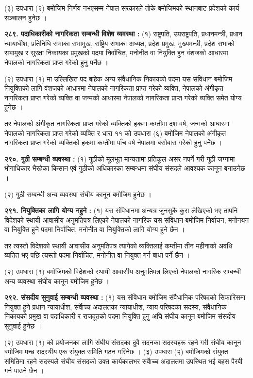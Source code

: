 (३) उपधारा (२) बमोजिम निर्णय नभएसम्म नेपाल सरकारले तोके बमोजिमको स्थानबाट प्रदेशको कार्य सञ्चालन हुनेछ ।

\textbf{२८९. पदाधिकारीको नागरिकता सम्बन्धी विशेष व्यवस्था :} (१) राष्ट्रपति, उपराष्ट्रपति, प्रधानमन्त्री, प्रधान न्यायाधीश, प्रतिनिधि सभाका सभामुख, राष्ट्रिय सभाका अध्यक्ष, प्रदेश प्रमुख, मुख्यमन्त्री, प्रदेश सभाको सभामुख र सुरक्षा निकायका प्रमुखको पदमा निर्वाचित, मनोनीत वा नियुक्ति हुन वंशजको आधारमा नेपालको नागरिकता प्राप्त गरेको हुनु पर्नेछ ।

(२) उपधारा (१) मा उल्लिखित पद बाहेक अन्य संवैधानिक निकायको पदमा यस संविधान बमोजिम नियुक्तिको लागि वंशजको आधारमा नेपालको नागरिकता प्राप्त गरेको व्यक्ति, नेपालको अंगीकृत नागरिकता प्राप्त गरेको व्यक्ति वा जन्मको आधारमा नेपालको नागरिकता प्राप्त गरेको व्यक्ति समेत योग्य हुनेछ ।

तर नेपालको अंगीकृत नागरिकता प्राप्त गरेको व्यक्तिको हकमा कम्तीमा दश वर्ष, जन्मको आधारमा नेपालको नागरिकता प्राप्त गरेको व्यक्ति र धारा ११ को उपधारा (६) बमोजिम नेपालको अंगीकृत नागरिकता प्राप्त गरेको व्यक्तिको हकमा कम्तीमा पाँच वर्ष नेपालमा बसोबास गरेको हुनु पर्नेछ ।

\textbf{२९०. गुठी सम्बन्धी व्यवस्था :} (१) गुठीको मूलभूत मान्यतामा प्रतिकूल असर नपर्ने गरी गुठी जग्गामा भोगाधिकार भैरहेका किसान एवं गुठीको अधिकारका सम्बन्धमा संघीय संसदले आवश्यक कानून बनाउनेछ ।

(२) गुठी सम्बन्धी अन्य व्यवस्था संघीय कानून बमोजिम हुनेछ ।

\textbf{२९१. नियुक्तिका लागि योग्य नहुने :} (१) यस संविधानमा अन्यत्र जुनसुकै कुरा लेखिएको भए तापनि विदेशको स्थायी आवासीय अनुमतिपत्र लिएको नेपालको नागरिक यस संविधान बमोजिम निर्वाचन, मनोनयन वा नियुक्ति हुने पदमा निर्वाचित, मनोनीत वा नियुक्तिको लागि योग्य हुने छैन ।

तर त्यस्तो विदेशको स्थायी आवासीय अनुमतिपत्र त्यागेको व्यक्तिलाई कम्तीमा तीन महीनाको अवधि व्यतित भए पछि त्यस्तो पदमा निर्वाचित, मनोनीत वा नियुक्त गर्न बाधा पर्ने छैन ।

(२) उपधारा (१) बमोजिमको विदेशको स्थायी आवासीय अनुमतिपत्र लिएको नेपालको नागरिक सम्बन्धी अन्य व्यवस्था संघीय कानून बमोजिम हुनेछ ।

\textbf{२९२. संसदीय सुनुवाई सम्बन्धी व्यवस्था :} (१) यस संविधान बमोजिम संवैधानिक परिषदको सिफारिसमा नियुक्त हुने प्रधान न्यायाधीश, सर्वाेच्च अदालतका न्यायाधीश, न्याय परिषदका सदस्य, संवैधानिक निकायको प्रमुख वा पदाधिकारी र राजदूतको पदमा नियुक्ति हुनु अघि संघीय कानून बमोजिम संसदीय सुनुवाई हुनेछ ।

(२) उपधारा (१) को प्रयोजनका लागि संघीय संसदका दुवै सदनका सदस्यहरू रहने गरी संघीय कानून बमोजिम पन्ध्र सदस्यीय एक संयुक्त समिति गठन गरिनेछ ।
(३) उपधारा (२) बमोजिमको संयुक्त समितिमा रहने सदस्यले संघीय संसदको उक्त कार्यकालभर सर्वाेच्च अदालतमा उपस्थित भई बहस पैरबी गर्न पाउने छैन ।

